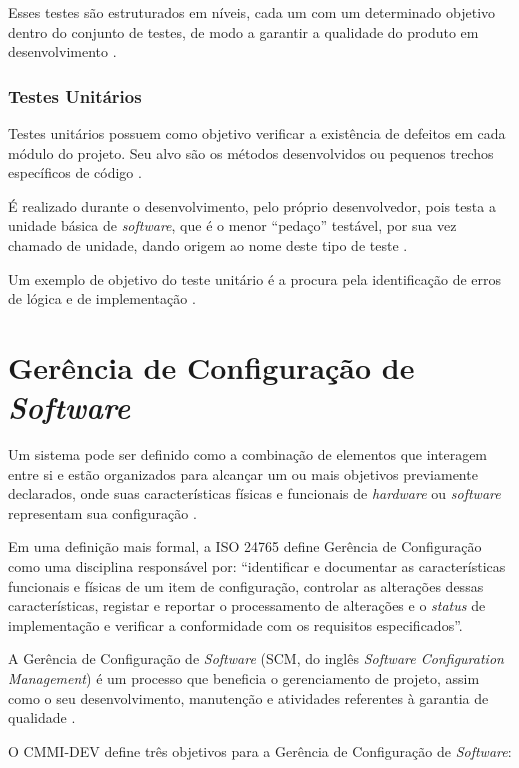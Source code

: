 Esses testes são estruturados em níveis, cada um com um determinado objetivo dentro do conjunto de testes, de modo a garantir a qualidade do produto em desenvolvimento \cite{sw_test_tech}.

    \subsubsection{Testes Unitários}
    Testes unitários possuem como objetivo verificar a existência de defeitos em cada módulo do projeto. Seu alvo são os métodos desenvolvidos ou pequenos trechos específicos de código \cite{artigo_intro_teste}.

    É realizado durante o desenvolvimento, pelo próprio desenvolvedor, pois testa a unidade básica de \textit{software}, que é o menor ``pedaço''  testável, por sua vez chamado de unidade, dando origem ao nome deste tipo de teste \cite{sw_test_tech}.

    Um exemplo de objetivo do teste unitário é a procura pela identificação de erros de lógica e de implementação \cite{maldonado}.

\section{Gerência de Configuração de \textit{Software}}
Um sistema pode ser definido como a combinação de elementos que interagem entre si e estão organizados para alcançar um ou mais objetivos previamente declarados, onde suas características físicas e funcionais de \textit{hardware} ou \textit{software} representam sua configuração \cite{SWEBOK2014}.

Em uma definição mais formal, a ISO 24765 \cite{iso_24765} define Gerência de Configuração como uma disciplina responsável por: ``identificar e documentar as características funcionais e físicas de um item de configuração, controlar as alterações dessas características, registar e reportar o processamento de alterações e o \textit{status} de implementação e verificar a conformidade com os requisitos especificados''.

A Gerência de Configuração de \textit{Software} (SCM, do inglês \textit{\textit{Software} Configuration Management}) é um processo que beneficia o gerenciamento de projeto, assim como o seu desenvolvimento, manutenção e atividades referentes à garantia de qualidade \cite{SWEBOK2014}.

O CMMI-DEV \cite{cmmi_dev} define três objetivos para a Gerência de Configuração de \textit{Software}:

